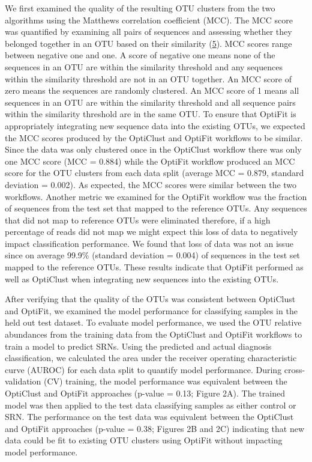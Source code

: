 \documentclass[
]{article}
\begin{document}
We first examined the quality of the resulting OTU clusters from the two
algorithms using the Matthews correlation coefficient (MCC). The MCC
score was quantified by examining all pairs of sequences and assessing
whether they belonged together in an OTU based on their similarity
(\protect\hyperlink{ref-westcott2017}{5}). MCC scores range between
negative one and one. A score of negative one means none of the
sequences in an OTU are within the similarity threshold and any
sequences within the similarity threshold are not in an OTU together. An
MCC score of zero means the sequences are randomly clustered. An MCC
score of 1 means all sequences in an OTU are within the similarity
threshold and all sequence pairs within the similarity threshold are in
the same OTU. To ensure that OptiFit is appropriately integrating new
sequence data into the existing OTUs, we expected the MCC scores
produced by the OptiClust and OptiFit workflows to be similar. Since the
data was only clustered once in the OptiClust workflow there was only
one MCC score (MCC = 0.884) while the OptiFit workflow produced an MCC
score for the OTU clusters from each data split (average MCC = 0.879,
standard deviation = 0.002). As expected, the MCC scores were similar
between the two workflows. Another metric we examined for the OptiFit
workflow was the fraction of sequences from the test set that mapped to
the reference OTUs. Any sequences that did not map to reference OTUs
were eliminated therefore, if a high percentage of reads did not map we
might expect this loss of data to negatively impact classification
performance. We found that loss of data was not an issue since on
average 99.9\% (standard deviation = 0.004) of sequences in the test set
mapped to the reference OTUs. These results indicate that OptiFit
performed as well as OptiClust when integrating new sequences into the
existing OTUs.

After verifying that the quality of the OTUs was consistent between
OptiClust and OptiFit, we examined the model performance for classifying
samples in the held out test dataset. To evaluate model performance, we
used the OTU relative abundances from the training data from the
OptiClust and OptiFit workflows to train a model to predict SRNs. Using
the predicted and actual diagnosis classification, we calculated the
area under the receiver operating characteristic curve (AUROC) for each
data split to quantify model performance. During cross-validation (CV)
training, the model performance was equivalent between the OptiClust and
OptiFit approaches (p-value = 0.13; Figure 2A). The trained model was
then applied to the test data classifying samples as either control or
SRN. The performance on the test data was equivalent between the
OptiClust and OptiFit approaches (p-value = 0.38; Figures 2B and 2C)
indicating that new data could be fit to existing OTU clusters using
OptiFit without impacting model performance.
\end{document}
